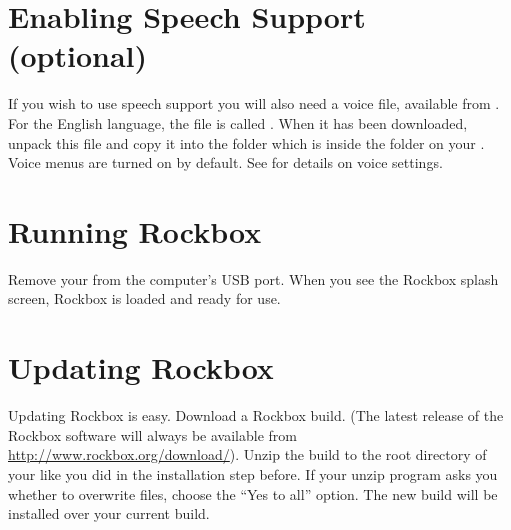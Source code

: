 \section{Enabling Speech Support (optional)}\label{sec:enabling_speech_support}
If you wish to use speech support you will also need a voice file, available
from . For the English language, the file is called
. When it has been downloaded, unpack this file and copy
it into the  folder which is inside the  folder on
your \dap{}. Voice menus are turned on by default. See
 for details on voice settings.

\section{Running Rockbox}
Remove your \dap{} from the computer's USB port.%
%
%
%
When you see the Rockbox splash screen, Rockbox is loaded and ready for
use.


\section{Updating Rockbox} Updating Rockbox is easy. Download a Rockbox build.
(The latest release of the Rockbox software will always be available from
\url{http://www.rockbox.org/download/}). Unzip the build to the root directory
of your \dap{} like you did in the installation step before. If your unzip
program asks you whether to overwrite files, choose the ``Yes to all'' option.
The new build will be installed over your current build.

